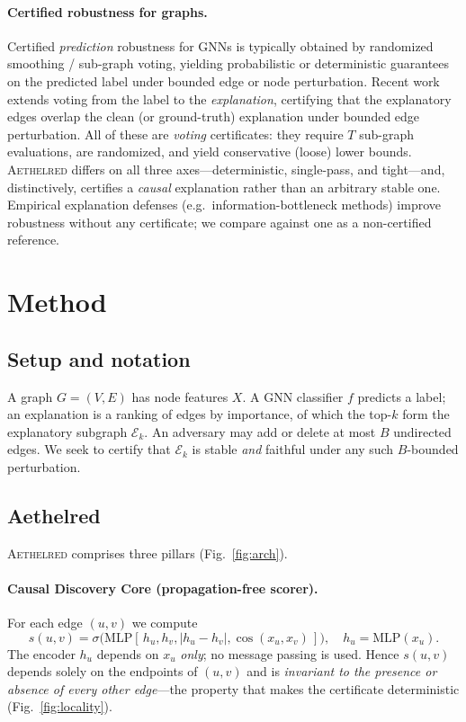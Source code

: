 \documentclass[letterpaper]{article}
\newcommand{\aeth}{\textsc{Aethelred}}
\newcommand{\Ek}{\mathcal{E}_k}
\begin{document}
\paragraph{Certified robustness for graphs.}
Certified \emph{prediction} robustness for GNNs is typically obtained by
randomized smoothing / sub-graph voting, yielding probabilistic or deterministic
guarantees on the predicted label under bounded edge or node perturbation.
Recent work extends voting from the label to the \emph{explanation}, certifying
that the explanatory edges overlap the clean (or ground-truth) explanation under
bounded edge perturbation. All of these are \emph{voting} certificates: they
require $T$ sub-graph evaluations, are randomized, and yield conservative
(loose) lower bounds. \aeth{} differs on all three axes---deterministic,
single-pass, and tight---and, distinctively, certifies a \emph{causal}
explanation rather than an arbitrary stable one. Empirical explanation defenses
(e.g.\ information-bottleneck methods) improve robustness without any
certificate; we compare against one as a non-certified reference.

\section{Method}
\label{sec:method}

\subsection{Setup and notation}
A graph $G=(V,E)$ has node features $X$. A GNN classifier $f$ predicts a label;
an explanation is a ranking of edges by importance, of which the top-$k$ form the
explanatory subgraph $\Ek$. An adversary may add or delete at most $B$ undirected
edges. We seek to certify that $\Ek$ is stable \emph{and} faithful under any such
$B$-bounded perturbation.

\subsection{Aethelred}
\aeth{} comprises three pillars (Fig.~\ref{fig:arch}).

\paragraph{Causal Discovery Core (propagation-free scorer).}
For each edge $(u,v)$ we compute
\[
  s(u,v)=\sigma\!\big(\mathrm{MLP}[\,h_u,h_v,|h_u-h_v|,\cos(x_u,x_v)\,]\big),
  \quad h_u=\mathrm{MLP}(x_u).
\]
The encoder $h_u$ depends on $x_u$ \emph{only}; no message passing is used. Hence
$s(u,v)$ depends solely on the endpoints of $(u,v)$ and is \emph{invariant to the
presence or absence of every other edge}---the property that makes the
certificate deterministic (Fig.~\ref{fig:locality}).
\end{document}
